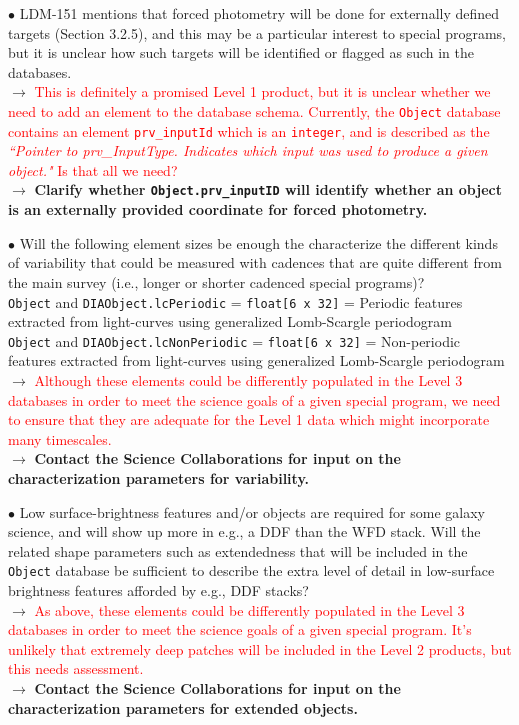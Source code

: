 \documentclass[DM,lsstdraft,toc]{lsstdoc}
\begin{document}
$\bullet$ LDM-151 mentions that forced photometry will be done for externally defined targets (Section 3.2.5), and this may be a particular interest to special programs, but it is unclear how such targets will be identified or flagged as such in the databases. \\
$\rightarrow$ \textcolor{red}{This is definitely a promised Level 1 product, but it is unclear whether we need to add an element to the database schema. Currently, the {\tt Object} database contains an element {\tt prv\_inputId} which is an {\tt integer}, and is described as the {\it ``Pointer to prv\_InputType. Indicates which input was used to produce a given object."} Is that all we need?} \\
$\rightarrow$  \textbf{Clarify whether {\tt Object.prv\_inputID} will identify whether an object is an externally provided coordinate for forced photometry.}

$\bullet$ Will the following element sizes be enough the characterize the different kinds of variability that could be measured with cadences that are quite different from the main survey (i.e., longer or shorter cadenced special programs)? \\
{\tt Object} and {\tt DIAObject.lcPeriodic} = {\tt float[6 x 32]} = Periodic features extracted from light-curves using generalized Lomb-Scargle periodogram \\
{\tt Object} and {\tt DIAObject.lcNonPeriodic} = {\tt float[6 x 32]} = Non-periodic features extracted from light-curves using generalized Lomb-Scargle periodogram \\
$\rightarrow$ \textcolor{red}{Although these elements could be differently populated in the Level 3 databases in order to meet the science goals of a given special program, we need to ensure that they are adequate for the Level 1 data which might incorporate many timescales.}\\
$\rightarrow$  \textbf{Contact the Science Collaborations for input on the characterization parameters for variability.}

$\bullet$ Low surface-brightness features and/or objects are required for some galaxy science, and will show up more in e.g., a DDF than the WFD stack. Will the related shape parameters such as extendedness that will be included in the {\tt Object} database be sufficient to describe the extra level of detail in low-surface brightness features afforded by e.g., DDF stacks? \\
$\rightarrow$ \textcolor{red}{As above, these elements could be differently populated in the Level 3 databases in order to meet the science goals of a given special program. It's unlikely that extremely deep patches will be included in the Level 2 products, but this needs assessment.}\\
$\rightarrow$  \textbf{Contact the Science Collaborations for input on the characterization parameters for extended objects.}
\end{document}
